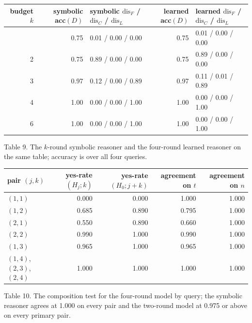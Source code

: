{\def\LTcaptype{none} %
\begin{longtable}[]{@{}rrlrl@{}}
\toprule\noalign{}
budget \(k\) & symbolic acc\((D)\) & symbolic \(\mathrm{dis}_F\) / \(\mathrm{dis}_C\) / \(\mathrm{dis}_L\) & learned acc\((D)\) & learned \(\mathrm{dis}_F\) / \(\mathrm{dis}_C\) / \(\mathrm{dis}_L\) \\
\midrule\noalign{}
\endhead
\bottomrule\noalign{}
\endlastfoot
1 & 0.75 & 0.01 / 0.00 / 0.00 & 0.75 & 0.01 / 0.00 / 0.00 \\
2 & 0.75 & 0.89 / 0.00 / 0.00 & 0.75 & 0.89 / 0.00 / 0.00 \\
3 & 0.97 & 0.12 / 0.00 / 0.89 & 0.97 & 0.11 / 0.01 / 0.89 \\
4 & 1.00 & 0.00 / 0.00 / 1.00 & 1.00 & 0.00 / 0.00 / 1.00 \\
6 & 1.00 & 0.00 / 0.00 / 1.00 & 1.00 & 0.00 / 0.00 / 1.00 \\
\end{longtable}
}

Table 9. The \(k\)-round symbolic reasoner and the four-round learned reasoner on the same table; accuracy is over all four queries.

{\def\LTcaptype{none} %
\begin{longtable}[]{@{}lrrrr@{}}
\toprule\noalign{}
pair \((j,k)\) & yes-rate \((H_j;k)\) & yes-rate \((H_0;j{+}k)\) & agreement on \(t\) & agreement on \(n\) \\
\midrule\noalign{}
\endhead
\bottomrule\noalign{}
\endlastfoot
\((1,1)\) & 0.000 & 0.000 & 1.000 & 1.000 \\
\((1,2)\) & 0.685 & 0.890 & 0.795 & 1.000 \\
\((2,1)\) & 0.550 & 0.890 & 0.660 & 1.000 \\
\((2,2)\) & 0.990 & 1.000 & 0.990 & 1.000 \\
\((1,3)\) & 0.965 & 1.000 & 0.965 & 1.000 \\
\((1,4)\), \((2,3)\), \((2,4)\) & 1.000 & 1.000 & 1.000 & 1.000 \\
\end{longtable}
}

Table 10. The composition test for the four-round model by query; the symbolic reasoner agrees at 1.000 on every pair and the two-round model at 0.975 or above on every primary pair.
